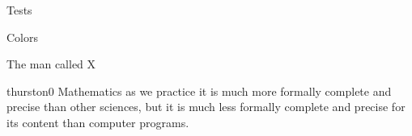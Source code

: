 \documentclass{PalisadesLakesBook}
\begin{document}

\begin{plSection}{Tests}

\begin{plSection}{Colors}

\begin{plDiagram}{}{}{}
\end{plDiagram}
\begin{plTable}{}{}{}
\end{plTable}
\begin{plQuote}{}{}{}
\end{plQuote}
\begin{plAlgorithm}{}{}{}
\end{plAlgorithm}
\begin{plListing}{}{}{}
\end{plListing}

\begin{plNote}{}{}{}
\end{plNote}
\begin{plExercise}{}{}{}
\end{plExercise}

\begin{plDefinition}{}{}{}
\end{plDefinition}
\begin{plExample}{}{}{}
\end{plExample}
\begin{plAxiom}{}{}{}
\end{plAxiom}
\begin{plAxiomSchema}{}{}{}
\end{plAxiomSchema}
\begin{plLemma}{}{}{}
\end{plLemma}
\begin{plTheorem}{}{}{}
\end{plTheorem}
\begin{plCorollary}{}{}{}
\end{plCorollary}

\end{plSection}%

\begin{plSection}{The man called X}
\begin{plQuote}
{}%
{thurston0}%
{Mathematics as we practice it is much more formally
complete and precise than
other sciences, but it is much less formally complete and precise
for its content than computer programs.
}
\end{plQuote}


\end{plSection}
\end{plSection}
\end{document}
